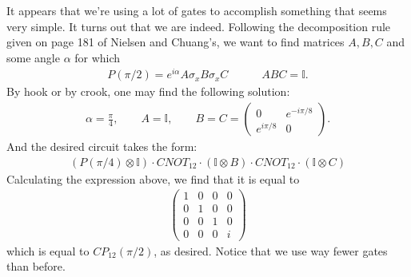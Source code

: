 \documentclass{article}
\theoremstyle{definition}
\newcommand{\al}{\alpha}
\newcommand{\f}[2]{\frac{#1}{#2}}
\begin{document}
\begin{enumerate}[label=(\alph*)]
It appears that we're using a lot of gates to accomplish something that seems very simple. It turns out that we are indeed. Following the decomposition rule given on page 181 of Nielsen and Chuang's, we want to find matrices $A,B,C$ and some angle $\alpha$ for which 
\begin{align*}
P(\pi/2) = e^{i\al} A\sigma_x B\sigma_x C \quad\quad\quad ABC = \mathbb{I}.
\end{align*}
By hook or by crook, one may find the following solution:
\begin{align*}
\al = \f{\pi}{4}, \quad\quad A=\mathbb{I}, \quad \quad B = C = \begin{pmatrix}
0 & e^{-i\pi/8} \\ e^{i\pi/8} & 0
\end{pmatrix}.
\end{align*}
And the desired circuit takes the form:
\begin{align*}
(P(\pi/4)\otimes \mathbb{I}) \cdot CNOT_{12} \cdot (\mathbb{I} \otimes B) \cdot CNOT_{12} \cdot (\mathbb{I} \otimes C)
\end{align*}
Calculating the expression above, we find that it is equal to
\begin{align*}
\begin{pmatrix}
1 & 0 & 0 & 0 \\
0 & 1 & 0 & 0 \\
0 & 0 & 1 & 0 \\
0 & 0 & 0 & i
\end{pmatrix}
\end{align*}
which is equal to $CP_{12}(\pi/2)$, as desired. Notice that we use way fewer gates than before. 
\end{enumerate}
\end{document}
